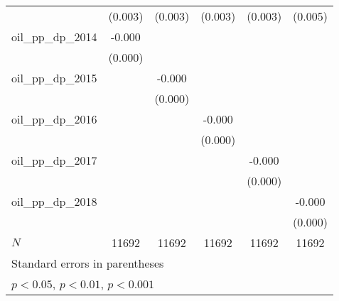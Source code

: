 {\begin{tabular}{l*{5}{c}}
            &     (0.003)         &     (0.003)         &     (0.003)         &     (0.003)         &     (0.005)         \\
[1em]
oil\_pp\_dp\_2014&      -0.000         &                     &                     &                     &                     \\
            &     (0.000)         &                     &                     &                     &                     \\
[1em]
oil\_pp\_dp\_2015&                     &      -0.000         &                     &                     &                     \\
            &                     &     (0.000)         &                     &                     &                     \\
[1em]
oil\_pp\_dp\_2016&                     &                     &      -0.000         &                     &                     \\
            &                     &                     &     (0.000)         &                     &                     \\
[1em]
oil\_pp\_dp\_2017&                     &                     &                     &      -0.000         &                     \\
            &                     &                     &                     &     (0.000)         &                     \\
[1em]
oil\_pp\_dp\_2018&                     &                     &                     &                     &      -0.000         \\
            &                     &                     &                     &                     &     (0.000)         \\
\hline
\(N\)       &       11692         &       11692         &       11692         &       11692         &       11692         \\
\hline\hline
\multicolumn{6}{l}{\footnotesize Standard errors in parentheses}\\
\multicolumn{6}{l}{\footnotesize \sym{*} \(p<0.05\), \sym{**} \(p<0.01\), \sym{***} \(p<0.001\)}\\
\end{tabular}
}
